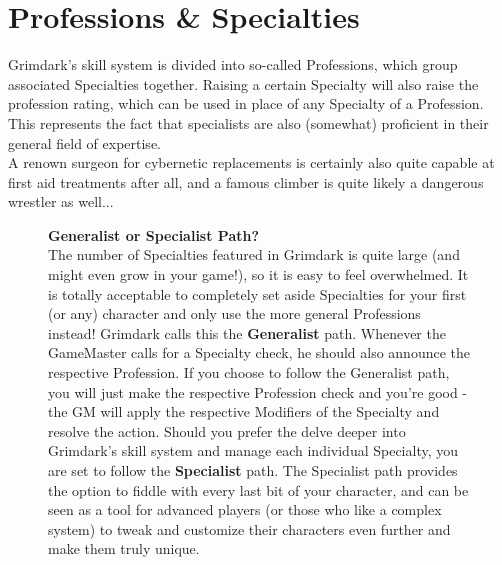 \chapter{Professions \& Specialties}
Grimdark's skill system is divided into so-called Professions, which group associated Specialties together. Raising a certain Specialty will also raise the profession rating, which can be used in place of any Specialty of a Profession. 
This represents the fact that specialists are also (somewhat) proficient in their general field of expertise.\\
A renown surgeon for cybernetic replacements is certainly also quite capable at first aid treatments after all, and a famous climber is quite likely a dangerous wrestler as well...
\begin{figure}[ht]
	\begin{DndReadAloud}
	{\large\textbf{Generalist or Specialist Path?}}\\\noindent
	The number of Specialties featured in Grimdark is quite large (and might even grow in your game!), so it is easy to feel overwhelmed.
	It is totally acceptable to completely set aside Specialties for your first (or any) character and only use the more general Professions instead! Grimdark calls this the \textbf{Generalist} path.
	Whenever the GameMaster calls for a Specialty check, he should also announce the respective Profession.
	If you choose to follow the Generalist path, you will just make the respective Profession check and you're good - the GM will apply the respective Modifiers of the Specialty and resolve the action.
\noindent
	Should you prefer the delve deeper into Grimdark's skill system and manage each individual Specialty, you are set to follow the \textbf{Specialist} path.
	The Specialist path provides the option to fiddle with every last bit of your character, and can be seen as a tool for advanced players (or those who like a complex system) to tweak and customize their characters even further and make them truly unique.
	\end{DndReadAloud}
\end{figure}

